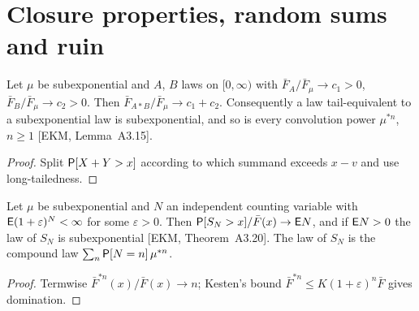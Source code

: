 \section{Closure properties, random sums and ruin}

\begin{theorem}
  \label{thm:subexp-closure}
  \leanok
  Let $\mu$ be subexponential and $A$, $B$ laws on $[0,\infty)$ with
  $\bar F_A/\bar F_\mu \to c_1 > 0$, $\bar F_B/\bar F_\mu \to c_2 > 0$. Then
  $\bar F_{A*B}/\bar F_\mu \to c_1 + c_2$. Consequently a law tail-equivalent to a subexponential
  law is subexponential, and so is every convolution power $\mu^{*n}$, $n \ge 1$
  [EKM, Lemma~A3.15].
\end{theorem}
\begin{proof}
  \leanok
  Split $\mathsf{P}[X + Y > x]$ according to which summand exceeds $x - v$ and use long-tailedness.
\end{proof}

\begin{theorem}
  \label{thm:random-sums}
  \leanok
  Let $\mu$ be subexponential and $N$ an independent counting variable with
  $\mathsf{E}(1+\varepsilon)^N < \infty$ for some $\varepsilon > 0$. Then
  $\mathsf{P}[S_N > x] / \bar F(x) \to \mathsf{E} N$, and if $\mathsf{E} N > 0$ the law of $S_N$ is subexponential
  [EKM, Theorem~A3.20]. The law of $S_N$ is the compound law
  $\sum_n \mathsf{P}[N = n] \, \mu^{*n}$.
\end{theorem}
\begin{proof}
  \leanok
  Termwise $\bar F^{*n}(x)/\bar F(x) \to n$; Kesten's bound
  $\bar F^{*n} \le K(1+\varepsilon)^n \bar F$ gives domination.
\end{proof}

